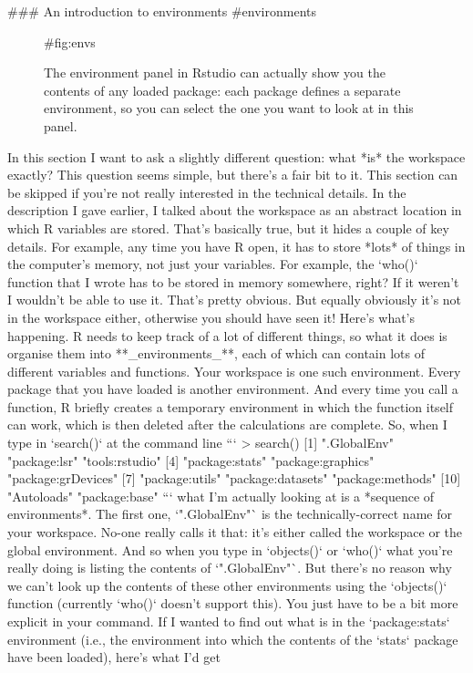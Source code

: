 ### An introduction to environments {#environments}


\begin{figure}[t]
\begin{center}
\caption{The environment panel in Rstudio can actually show you the contents of any loaded package: each package defines a separate environment, so you can select the one you want to look at in this panel.}
{#fig:envs}
\HR
\end{center}
\end{figure} 


In this section I want to ask a slightly different question: what *is* the workspace exactly? This question seems simple, but there's a fair bit to it. This section can be skipped if you're not really interested in the technical details. In the description I gave earlier, I talked about the workspace as an abstract location in which R variables are stored. That's basically true, but it hides a couple of key details. For example, any time you have R open, it has to store *lots* of things in the computer's memory, not just your variables. For example, the `who()` function that I wrote has to be stored in memory somewhere, right? If it weren't I wouldn't be able to use it. That's pretty obvious. But equally obviously it's not in the workspace either, otherwise you should have seen it! Here's what's happening. R needs to keep track of a lot of different things, so what it does is organise them into **_environments_**, each of which can contain lots of different variables and functions. Your workspace is one such environment. Every package that you have loaded is another environment. And every time you call a function, R briefly creates a temporary environment in which the function itself can work, which is then deleted after the calculations are complete. So, when I type in `search()` at the command line
```
> search()
 [1] ".GlobalEnv"        "package:lsr"       "tools:rstudio"    
 [4] "package:stats"     "package:graphics"  "package:grDevices"
 [7] "package:utils"     "package:datasets"  "package:methods"  
[10] "Autoloads"         "package:base"    
```
what I'm actually looking at is a *sequence of environments*. The first one, `".GlobalEnv"` is the technically-correct name for your workspace. No-one really calls it that: it's either called the workspace or the global environment. And so when you type in `objects()` or `who()` what you're really doing is listing the contents of `".GlobalEnv"`. But there's no reason why we can't look up the contents of these other environments using the `objects()` function (currently `who()` doesn't support this). You just have to be a bit more explicit in your command. If I wanted to find out what is in the `package:stats` environment (i.e., the environment into which the contents of the `stats` package have been loaded), here's what I'd get
